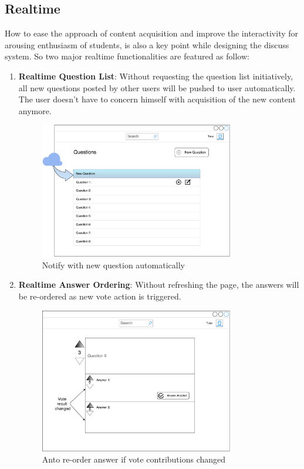 \subsection{Realtime}
How to ease the approach of content acquisition and improve the interactivity for arousing enthusiasm of students, is also a key point while designing the discuss system. So two major realtime functionalities are featured as follow: 


\begin{enumerate}
\item
\textbf{Realtime Question List}: Without requesting the question list initiatively, all new questions posted by other users will be pushed to user automatically. The user doesn't have to concern himself with acquisition of the new content anymore.

\begin{figure}[!htbp]
  \centering
    \includegraphics[width=0.8\textwidth]{Figures/mockup/question-notify.pdf}
  \caption{Notify with new question automatically}
\end{figure}

\item
\textbf{Realtime Answer Ordering}: Without refreshing the page, the answers will be re-ordered as new vote action is triggered.

\begin{figure}[!htbp]
  \centering
    \includegraphics[width=0.8\textwidth]{Figures/mockup/votechange.pdf}
  \caption{Anto re-order answer if vote contributions changed}
\end{figure}


\end{enumerate}
